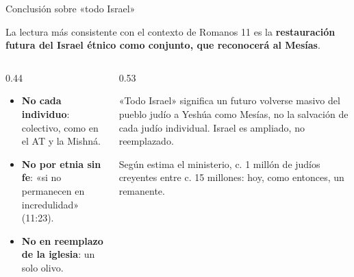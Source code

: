 \begin{frame}{Conclusión sobre «todo Israel»}
\begin{tcolorbox}[colback=piedra,colframe=ladrillo,boxrule=1pt,arc=3pt,fontupper=\small]
La lectura más consistente con el contexto de Romanos 11 es la \textbf{restauración futura del Israel étnico como conjunto, que reconocerá al Mesías}.
\end{tcolorbox}
\begin{columns}[T,onlytextwidth]
\begin{column}{0.44\textwidth}\small
\begin{itemize}
\item \textbf{No cada individuo}: colectivo, como en el AT y la Mishná.
\item \textbf{No por etnia sin fe}: «si no permanecen en incredulidad» (11:23).
\item \textbf{No en reemplazo de la iglesia}: un solo olivo.
\end{itemize}
\end{column}
\begin{column}{0.53\textwidth}
\begin{cita}[fontupper=\scriptsize\itshape]«Todo Israel» significa un futuro volverse masivo del pueblo judío a Yeshúa como Mesías, no la salvación de cada judío individual. Israel es ampliado, no reemplazado.\end{cita}
\scriptsize Según estima el ministerio, c. 1 millón de judíos creyentes entre c. 15 millones: hoy, como entonces, un remanente.
\end{column}
\end{columns}
\end{frame}

